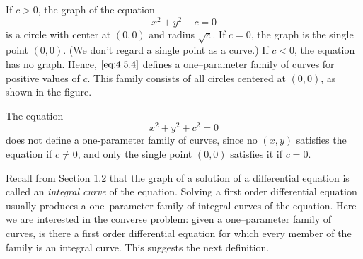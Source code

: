 \documentclass{ximera}
\begin{document}
 
 
\begin{example}\label{example:4.5.3}
If $c>0$,  the graph of the equation
\begin{equation} \label{eq:4.5.4}
x^2+y^2-c=0
\end{equation}
is a circle with center at $(0,0)$ and radius $\sqrt{c}$. If $c=0$, the
graph is the single point $(0,0)$. (We don't regard a single point as
a curve.) If $c<0$, the equation has no graph. Hence, $\eqref{eq:4.5.4}$
defines a one--parameter family of curves for positive values of $c$.
This family consists of all circles centered at $(0,0)$, as shown in the figure.

\begin{center}
\end{center}
 
 
\end{example}
 
\begin{example}\label{example:4.5.4}
 The equation
$$
x^2+y^2+c^2=0
$$
does not define a one-parameter family of curves, since no $(x,y)$
satisfies the equation if $c\neq 0$, and only the single point $(0,0)$
satisfies it if $c=0$.
\end{example}
 
Recall from \href{https://xerxes.ximera.org/differentialequations/main/basicConcepts/basicConcepts}{Section 1.2} that the graph of a solution of a
differential equation is called an \textit{integral curve} of the
equation. Solving a first order differential equation usually produces
a one--parameter family of integral curves of the equation. Here we
are interested in the converse problem:
given a one--parameter family of curves, is there a first order
differential equation for which every  member of the family is an integral
curve.
This suggests the next definition.
 
\end{document}
